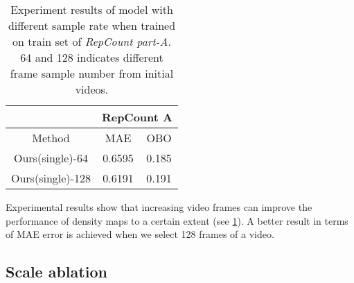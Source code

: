 \documentclass[10pt,twocolumn,letterpaper]{article}
\begin{document}
\begin{table}[ht]
	\begin{center}
		\begin{tabular}{c|cc}

			\hline
			                 & \multicolumn{2}{c}{RepCount A}                         \\ \hline
			Method           & \multicolumn{1}{c|}{MAE} & OBO   \\\hline
			Ours(single)-64  & \multicolumn{1}{c|}{0.6595}          & 0.185           \\
			Ours(single)-128 & \multicolumn{1}{c|}{0.6191}          & 0.191           \\ \hline
		\end{tabular}
	\end{center}
	\caption{
		Experiment results of model with different sample rate when trained on train set of \emph{RepCount part-A}. 64 and 128 indicates different frame sample number from initial videos.
	}
	\label{tab:64_128}
\end{table}

Experimental results show that increasing video frames can improve the performance of density maps to a certain extent (see \cref{tab:64_128}). A better result in terms of MAE error is achieved when we select 128 frames of a video. 


\subsection{Scale ablation}
\end{document}

